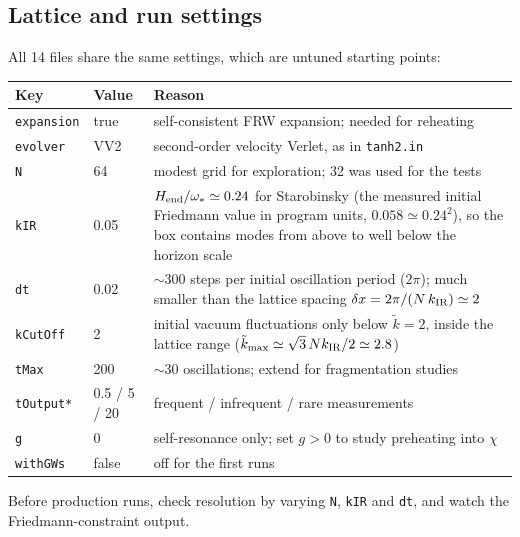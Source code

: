 \documentclass[11pt,a4paper]{article}
\newcommand{\file}[1]{\texttt{#1}}
\begin{document}
\subsection{Lattice and run settings}
All 14 files share the same settings, which are untuned starting points:
\begin{center}
\renewcommand{\arraystretch}{1.15}
\begin{tabular}{@{}l l p{}@{}}
\toprule
Key & Value & Reason \\
\midrule
\texttt{expansion} & true & self-consistent FRW expansion; needed for reheating \\
\texttt{evolver} & VV2 & second-order velocity Verlet, as in \file{tanh2.in} \\
\texttt{N} & 64 & modest grid for exploration; 32 was used for the tests \\
\texttt{kIR} & 0.05 & $H_{\rm end}/\omega_*\simeq0.24$ for Starobinsky (the measured initial Friedmann value in program units, $0.058\simeq0.24^2$), so the box contains modes from above to well below the horizon scale \\
\texttt{dt} & 0.02 & $\sim300$ steps per initial oscillation period ($2\pi$); much smaller than the lattice spacing $\delta x=2\pi/(N\,k_{\rm IR})\simeq2$ \\
\texttt{kCutOff} & 2 & initial vacuum fluctuations only below $\tilde k=2$, inside the lattice range ($\tilde k_{\max}\simeq\sqrt3\,N k_{\rm IR}/2\simeq2.8$) \\
\texttt{tMax} & 200 & $\sim30$ oscillations; extend for fragmentation studies \\
\texttt{tOutput*} & 0.5 / 5 / 20 & frequent / infrequent / rare measurements \\
\texttt{g} & 0 & self-resonance only; set $g>0$ to study preheating into $\chi$ \\
\texttt{withGWs} & false & off for the first runs \\
\bottomrule
\end{tabular}
\end{center}
Before production runs, check resolution by varying \texttt{N}, \texttt{kIR} and \texttt{dt}, and watch the Friedmann-constraint output.
\end{document}
